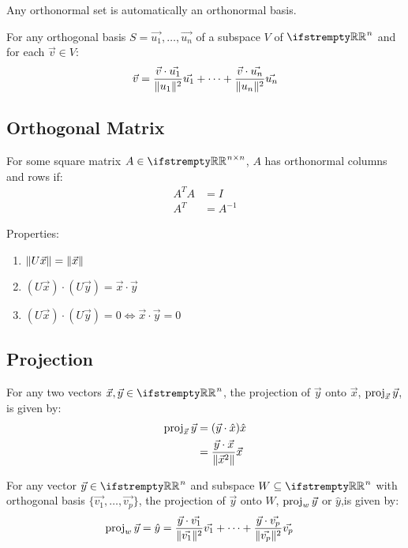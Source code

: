 \documentclass[12pt, a4paper]{article}
\begin{document}
\begin{multicols*}{3}
Any orthonormal set is automatically an orthonormal basis.

For any orthogonal basis $S = {\vec{u_1},\ldots,\vec{u_n}}$ of a subspace $V$ of $\RR^n$ and for each $\vec{v} \in V$:
\begin{align*}
  \vec{v} = \frac{\vec{v}\cdot\vec{u_1}}{\lVert u_1\rVert^2}\vec{u_1} + \cdots +  \frac{\vec{v}\cdot\vec{u_n}}{\lVert u_n\rVert^2}\vec{u_n}
\end{align*}

\subsection{Orthogonal Matrix}
For some square matrix $A \in \RR^{n{\times}n}$, $A$ has orthonormal columns and rows if:
\begin{align*}
  A^TA &= I \\
  A^T &= A^{-1}
\end{align*}

Properties:
\begin{enumerate}[\roman*.]
  \item $\lVert U\vec{x}\rVert = \lVert\vec{x}\rVert$
  \item $(U\vec{x})\cdot(U\vec{y}) = \vec{x}\cdot\vec{y}$
  \item $(U\vec{x})\cdot(U\vec{y}) = 0 \iff \vec{x}\cdot\vec{y} = 0$
\end{enumerate}

\colbreak

\subsection{Projection}
For any two vectors $\vec{x}, \vec{y} \in \RR^n$, the projection of $\vec{y}$ onto $\vec{x}$, $\operatorname{proj}_{\vec{x}}\vec{y}$, is given by:
\begin{align*}
  \operatorname{proj}_{\vec{x}}\vec{y} &= (\vec{y}\cdot\hat{x})\hat{x} \\
                         &= \frac{\vec{y}\cdot\vec{x}}{\lVert\vec{x}^2\rVert}\vec{x} 
\end{align*}


For any vector $\vec{y} \in \RR^n$ and subspace $W \subseteq \RR^n$ with orthogonal basis $\{\vec{v_1},\ldots,\vec{v_p}\}$, the projection of $\vec{y}$ onto $W$, $\operatorname{proj}_w\vec{y}$ or $\hat{y}$,is given by:
\begin{align*}
  \operatorname{proj}_w\vec{y} = \hat{y} &= \frac{\vec{y}\cdot\vec{v_1}}{\lVert\vec{v_1}\rVert^2}\vec{v_1} + \cdots +  \frac{\vec{y}\cdot\vec{v_p}}{\lVert\vec{v_p}\rVert^2}\vec{v_p}  
\end{align*}


\end{multicols*}
\end{document}
